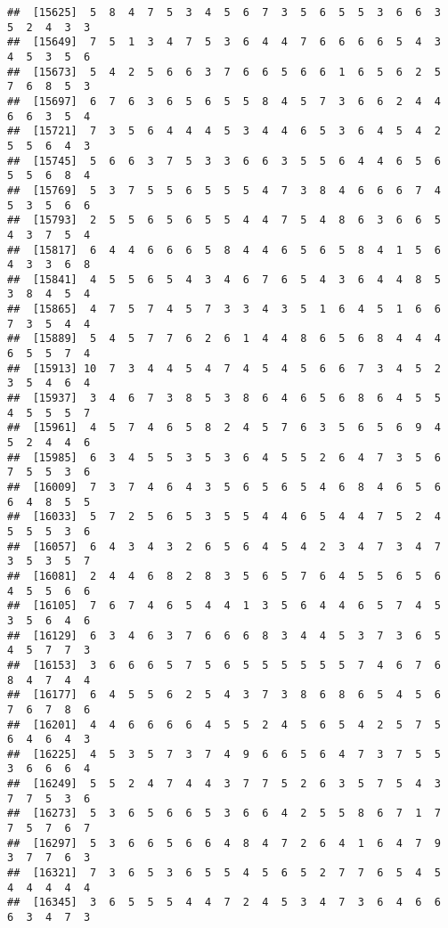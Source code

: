 \documentclass[
]{book}
\begin{document}
\begin{verbatim}
##  [15625]  5  8  4  7  5  3  4  5  6  7  3  5  6  5  5  3  6  6  3  5  2  4  3  3
##  [15649]  7  5  1  3  4  7  5  3  6  4  4  7  6  6  6  6  5  4  3  4  5  3  5  6
##  [15673]  5  4  2  5  6  6  3  7  6  6  5  6  6  1  6  5  6  2  5  7  6  8  5  3
##  [15697]  6  7  6  3  6  5  6  5  5  8  4  5  7  3  6  6  2  4  4  6  6  3  5  4
##  [15721]  7  3  5  6  4  4  4  5  3  4  4  6  5  3  6  4  5  4  2  5  5  6  4  3
##  [15745]  5  6  6  3  7  5  3  3  6  6  3  5  5  6  4  4  6  5  6  5  5  6  8  4
##  [15769]  5  3  7  5  5  6  5  5  5  4  7  3  8  4  6  6  6  7  4  5  3  5  6  6
##  [15793]  2  5  5  6  5  6  5  5  4  4  7  5  4  8  6  3  6  6  5  4  3  7  5  4
##  [15817]  6  4  4  6  6  6  5  8  4  4  6  5  6  5  8  4  1  5  6  4  3  3  6  8
##  [15841]  4  5  5  6  5  4  3  4  6  7  6  5  4  3  6  4  4  8  5  3  8  4  5  4
##  [15865]  4  7  5  7  4  5  7  3  3  4  3  5  1  6  4  5  1  6  6  7  3  5  4  4
##  [15889]  5  4  5  7  7  6  2  6  1  4  4  8  6  5  6  8  4  4  4  6  5  5  7  4
##  [15913] 10  7  3  4  4  5  4  7  4  5  4  5  6  6  7  3  4  5  2  3  5  4  6  4
##  [15937]  3  4  6  7  3  8  5  3  8  6  4  6  5  6  8  6  4  5  5  4  5  5  5  7
##  [15961]  4  5  7  4  6  5  8  2  4  5  7  6  3  5  6  5  6  9  4  5  2  4  4  6
##  [15985]  6  3  4  5  5  3  5  3  6  4  5  5  2  6  4  7  3  5  6  7  5  5  3  6
##  [16009]  7  3  7  4  6  4  3  5  6  5  6  5  4  6  8  4  6  5  6  6  4  8  5  5
##  [16033]  5  7  2  5  6  5  3  5  5  4  4  6  5  4  4  7  5  2  4  5  5  5  3  6
##  [16057]  6  4  3  4  3  2  6  5  6  4  5  4  2  3  4  7  3  4  7  3  5  3  5  7
##  [16081]  2  4  4  6  8  2  8  3  5  6  5  7  6  4  5  5  6  5  6  4  5  5  6  6
##  [16105]  7  6  7  4  6  5  4  4  1  3  5  6  4  4  6  5  7  4  5  3  5  6  4  6
##  [16129]  6  3  4  6  3  7  6  6  6  8  3  4  4  5  3  7  3  6  5  4  5  7  7  3
##  [16153]  3  6  6  6  5  7  5  6  5  5  5  5  5  5  7  4  6  7  6  8  4  7  4  4
##  [16177]  6  4  5  5  6  2  5  4  3  7  3  8  6  8  6  5  4  5  6  7  6  7  8  6
##  [16201]  4  4  6  6  6  6  4  5  5  2  4  5  6  5  4  2  5  7  5  6  4  6  4  3
##  [16225]  4  5  3  5  7  3  7  4  9  6  6  5  6  4  7  3  7  5  5  3  6  6  6  4
##  [16249]  5  5  2  4  7  4  4  3  7  7  5  2  6  3  5  7  5  4  3  7  7  5  3  6
##  [16273]  5  3  6  5  6  6  5  3  6  6  4  2  5  5  8  6  7  1  7  7  5  7  6  7
##  [16297]  5  3  6  6  5  6  6  4  8  4  7  2  6  4  1  6  4  7  9  3  7  7  6  3
##  [16321]  7  3  6  5  3  6  5  5  4  5  6  5  2  7  7  6  5  4  5  4  4  4  4  4
##  [16345]  3  6  5  5  5  4  4  7  2  4  5  3  4  7  3  6  4  6  6  6  3  4  7  3

\end{verbatim}
\end{document}

